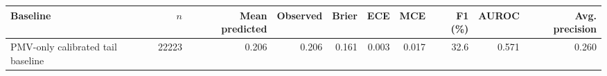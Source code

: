 \begin{tabular}{lrrrrrrrrr}
\toprule
Baseline & $n$ & Mean predicted & Observed & Brier & ECE & MCE & F1 (\%) & AUROC & Avg. precision \\
\midrule
PMV-only calibrated tail baseline & 22223 & 0.206 & 0.206 & 0.161 & 0.003 & 0.017 & 32.6 & 0.571 & 0.260 \\
\bottomrule
\end{tabular}

